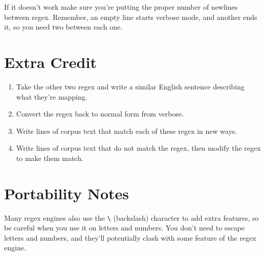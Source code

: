 If it doesn't work make sure you're putting the proper number of newlines between
regex.  Remember, an empty line starts verbose mode, and another ends it, so you
need two between each one.

\section{Extra Credit}

\begin{enumerate}
\item Take the other two regex and write a similar English sentence describing what
    they're mapping.
\item Convert the regex back to normal form from verbose.
\item Write lines of corpus text that match each of these regex in new ways.
\item Write lines of corpus text that do not match the regex, then modify the
    regex to make them match.
\end{enumerate}

\section{Portability Notes}

Many regex engines also use the \verb|\| (backslash) character to add extra
features, so be careful when you use it on letters and numbers.  You don't
need to escape letters and numbers, and they'll potentially clash with some
feature of the regex engine.

